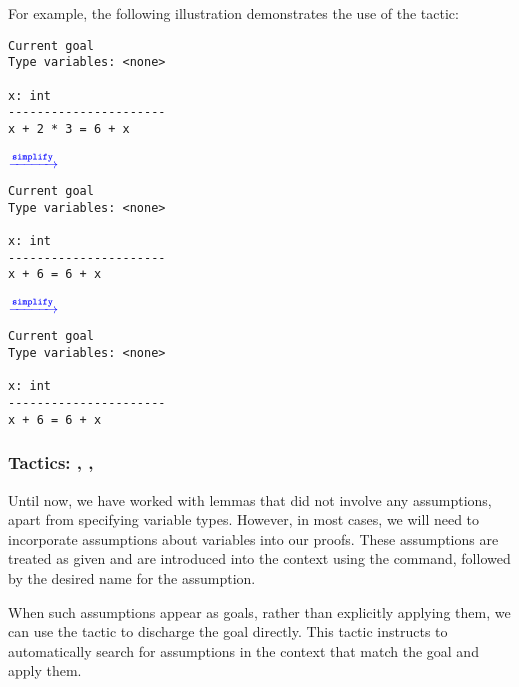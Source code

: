 For example, the following illustration demonstrates the use of the  tactic:\\
\begin{center}
\begin{minipage}{.25\textwidth}
\begin{lstlisting}[style=normal]
Current goal
Type variables: <none>

x: int
----------------------
x + 2 * 3 = 6 + x
\end{lstlisting}
\end{minipage}\hfill$\xrightarrow{\color{blue}\texttt{\bfseries simplify}}$\hfill
\begin{minipage}{.25\textwidth}
\begin{lstlisting}[style=normal]
Current goal
Type variables: <none>

x: int
----------------------
x + 6 = 6 + x
\end{lstlisting}
\end{minipage}\hfill$\xrightarrow{\color{blue}\texttt{\bfseries simplify}}$\hfill
\begin{minipage}{.25\textwidth}
\begin{lstlisting}[style=normal]
Current goal
Type variables: <none>

x: int
----------------------
x + 6 = 6 + x
\end{lstlisting}
\end{minipage}
\end{center}

\newpage
\subsubsection{Tactics: , , }
Until now, we have worked with lemmas that did not involve any assumptions, apart from specifying variable types. However, in most cases, we will need to incorporate assumptions about variables into our proofs. These assumptions are treated as given and are introduced into the context using the  command, followed by the desired name for the assumption.

When such assumptions appear as goals, rather than explicitly applying them, we can use the  tactic to discharge the goal directly. This tactic instructs \EasyCrypt to automatically search for assumptions in the context that match the goal and apply them.


